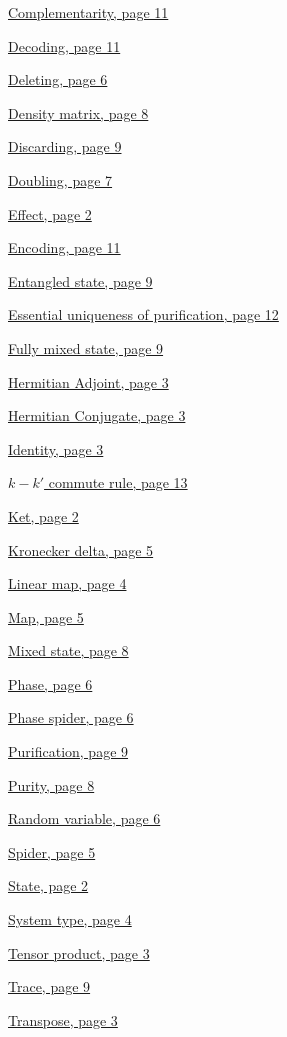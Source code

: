 \documentclass[]{article}
\begin{document}
\hyperref[complementarity]{Complementarity, page 11}

\hyperref[encodingdecoding]{Decoding, page 11}

\hyperref[spiders]{Deleting, page 6}

\hyperref[doubling]{Density matrix, page 8}

\hyperref[discarding]{Discarding, page 9}

\hyperref[doubling]{Doubling, page 7}

\hyperref[braandket]{Effect, page 2}

\hyperref[encodingdecoding]{Encoding, page 11}

\hyperref[entanglement]{Entangled state, page 9}

\hyperref[section:essentialuniqueness]{Essential uniqueness of purification, page 12}

\hyperref[discarding]{Fully mixed state, page 9}

\hyperref[braandket]{Hermitian Adjoint, page 3}

\hyperref[braandket]{Hermitian Conjugate, page 3}

\hyperref[identity]{Identity, page 3}

\hyperref[section:kkcommute]{$k-k'$ commute rule, page 13}

\hyperref[braandket]{Ket, page 2}

\hyperref[spiders]{Kronecker delta, page 5}

\hyperref[maps]{Linear map, page 4}

\hyperref[maps]{Map, page 5}

\hyperref[doubling]{Mixed state, page 8}

\hyperref[phasespiders]{Phase, page 6}

\hyperref[phasespiders]{Phase spider, page 6}

\hyperref[discarding]{Purification, page 9}

\hyperref[doubling]{Purity, page 8}

\hyperref[spiders]{Random variable, page 6}

\hyperref[spiders]{Spider, page 5}

\hyperref[braandket]{State, page 2}

\hyperref[identity]{System type, page 4}

\hyperref[section:tensorproduct]{Tensor product, page 3}

\hyperref[discarding]{Trace, page 9}

\hyperref[braandket]{Transpose, page 3}
\end{document}
